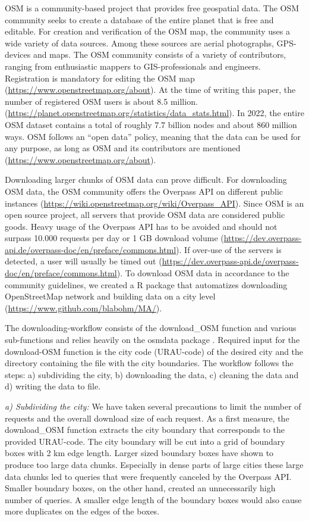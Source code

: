 \documentclass[10pt]{article}
\begin{document}
OSM is a community-based project that provides free geospatial data.
The OSM community seeks to create a database of the entire planet that is free and editable.
For creation and verification of the OSM map, the community uses a wide variety of data sources. 
Among these sources are aerial photographs, GPS-devices and maps.
The OSM community consists of a variety of contributors, ranging from enthusiastic mappers to GIS-professionals and engineers.
Registration is mandatory for editing the OSM map (\url{https://www.openstreetmap.org/about}).
At the time of writing this paper, the number of registered OSM users is about 8.5 million. (\url{https://planet.openstreetmap.org/statistics/data_stats.html}).
In 2022, the entire OSM dataset contains a total of roughly 7.7 billion nodes and about 860 million ways.
OSM follows an “open data” policy, meaning that the data can be used for any purpose, as long as OSM and its contributors are mentioned (\url{https://www.openstreetmap.org/about}).

Downloading larger chunks of OSM data can prove difficult. 
For downloading OSM data, the OSM community offers the Overpass API on different public instances (\url{https://wiki.openstreetmap.org/wiki/Overpass_API}).
Since OSM is an open source project, all servers that provide OSM data are considered public goods.
Heavy usage of the Overpass API has to be avoided and should not surpass 10.000 requests per day or 1 GB download volume (\url{https://dev.overpass-api.de/overpass-doc/en/preface/commons.html}).
If over-use of the servers is detected, a user will usually be timed out (\url{https://dev.overpass-api.de/overpass-doc/en/preface/commons.html}).
To download OSM data in accordance to the community guidelines, we created a R package that automatizes downloading OpenStreetMap network and building data on a city level (\url{https://www.github.com/blabohm/MA/}).

The downloading-workflow consists of the download\_OSM function and various sub-functions and relies heavily on the osmdata package \citep{Padgham.2022}.
Required input for the download-OSM function is the city code (URAU-code) of the desired city and the directory containing the file with the city boundaries.
The workflow follows the steps: a) subdividing the city, b) downloading the data, c) cleaning the data and d) writing the data to file.

\textit{a) Subdividing the city:} We have taken several precautions to limit the number of requests and the overall download size of each request. 
As a first measure, the download\_OSM function extracts the city boundary that corresponds to the provided URAU-code.
The city boundary will be cut into a grid of boundary boxes with 2 km edge length.
Larger sized boundary boxes have shown to produce too large data chunks. 
Especially in dense parts of large cities these large data chunks led to queries that were frequently canceled by the Overpass API.
Smaller boundary boxes, on the other hand, created an unnecessarily high number of queries.  
A smaller edge length of the boundary boxes would also cause more duplicates on the edges of the boxes.
\end{document}
